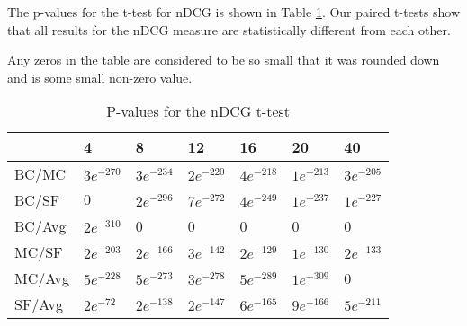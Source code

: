 The p-values for the t-test for nDCG is shown in Table \ref{tbl:ndcg_ttest}. Our paired t-tests show that all results for the nDCG measure are statistically different from each other.

Any zeros in the table are considered to be so small that it was rounded down and is some small non-zero value.

\begin{table}[H]
	\centering
	\begin{tabular}{|l|llllll|}\hline
		& 4 & 8 & 12 & 16 & 20 & 40 \\\hline
		BC/MC	& $3e^{-270}$	& $3e^{-234}$	& $2e^{-220}$	& $4e^{-218}$	& $1e^{-213}$ & $3e^{-205}$ \\
		BC/SF	& $0$	& $2e^{-296}$	& $7e^{-272}$	& $4e^{-249}$	& $1e^{-237}$ & $1e^{-227}$ \\
		BC/Avg	& $2e^{-310}$	& 0 & 0	& 0	& 0 & 0 \\
		MC/SF	& $2e^{-203}$	& $2e^{-166}$ 	& $3e^{-142}$	& $2e^{-129}$	& $1e^{-130}$ & $2e^{-133}$ \\
		MC/Avg	& $5e^{-228}$	& $5e^{-273}$ 	& $3e^{-278}$	& $5e^{-289}$	& $1e^{-309}$ & 0 \\
		SF/Avg	& $2e^{-72}$	& $2e^{-138}$ 	& $2e^{-147}$	& $6e^{-165}$	& $9e^{-166}$ & $5e^{-211}$ \\ \hline
	\end{tabular}
	\caption{P-values for the nDCG t-test}
	\label{tbl:ndcg_ttest}
\end{table}